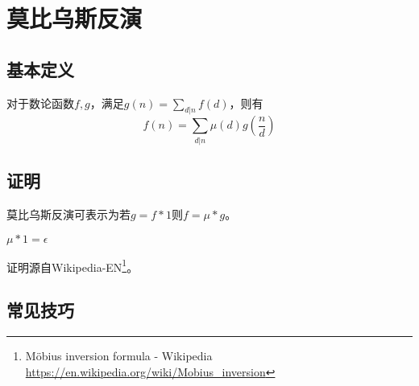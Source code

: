 \section{莫比乌斯反演}
\subsection{基本定义}
\begin{theorem}
	对于数论函数$f,g$，满足$\displaystyle g(n)=\sum_{d|n}f(d)$，则有
	\begin{displaymath}
		f(n)=\sum_{d|n}\mu(d)g(\frac{n}{d})
	\end{displaymath}
\end{theorem}
\subsection{证明}
莫比乌斯反演可表示为若$g=f*1$则$f=\mu*g$。
\begin{lemma}
	$\mu*1=\epsilon$
\end{lemma}

证明源自Wikipedia-EN\footnote{Möbius inversion formula - Wikipedia\\
\url{https://en.wikipedia.org/wiki/Mobius_inversion}}。
\subsection{常见技巧}
